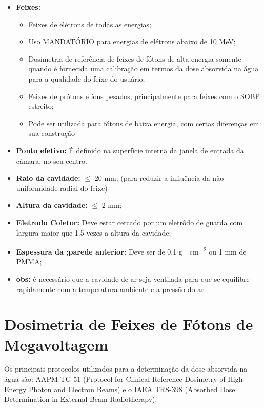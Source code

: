 \documentclass[11pt,a4paper]{article}
\newcounter{exemplo}
\begin{document}
	\begin{exemplo}
		\begin{itemize}[label=\textcolor{CarnationPink}{$\blacktriangleright$}]
			\item \textbf{Feixes:} 
				\begin{itemize}[label=\textcolor{CarnationPink}{$\star$}]
					\item Feixes de elétrons de todas as energias;
					\item Uso MANDATÓRIO para energias de elétrons abaixo de 10 MeV;
					\item Dosimetria de referência de feixes de fótons de alta energia somente quando é fornecida uma calibração em termos da dose absorvida na água para a qualidade do feixe do usuário;
					\item Feixes de prótons e íons pesados, principalmente para feixes com o SOBP estreito;
					\item Pode ser utilizada para fótons de baixa energia, com certas diferenças em sua construção
				\end{itemize}
			\item \textbf{Ponto efetivo:} É definido na superfície interna da janela de entrada da câmara, no seu centro.
			\item \textbf{Raio da cavidade: } $\leq$ 20 mm; (para reduzir a influência da não uniformidade radial do feixe)
			\item \textbf{Altura da cavidade:}  $\leq$ 2 mm;
			\item \textbf{Eletrodo Coletor:} Deve estar cercado por um eletrôdo de guarda com largura maior que 1.5 vezes a altura da cavidade;
			\item \textbf{Espessura da ;parede anterior:} Deve ser de 0.1 \unit{g \cdot cm^{-2}} ou 1 mm de PMMA;
			\item \textbf{obs:} é necessário que a cavidade de ar seja ventilada para que se equilibre rapidamente com a temperatura ambiente e a pressão do ar.
		\end{itemize}		
	\end{exemplo}



    \section{Dosimetria de Feixes de Fótons de Megavoltagem}

    Os principais protocolos utilizados para a determinação da dose absorvida na água são: AAPM TG-51 (Protocol for Clinical Reference Dosimetry of High-Energy Photon and Electron Beams) e  o IAEA TRS-398 (Absorbed Dose Determination in External Beam Radiotherapy).  
\end{document}
